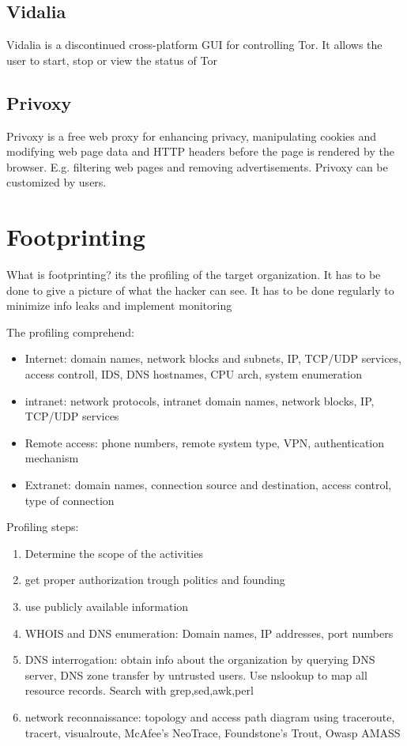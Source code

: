 \subsection{Vidalia}
Vidalia is a discontinued cross-platform GUI for controlling Tor.
It allows the user to start, stop or view the status of Tor

\subsection{Privoxy}
Privoxy is a free web proxy for enhancing
privacy, manipulating cookies and
modifying web page data and HTTP headers
before the page is rendered by the browser.
E.g. filtering web pages and removing
advertisements. Privoxy can be customized by
users.

\section{Footprinting}
What is footprinting? its the profiling of the target organization. It has to be done to give a picture of what the hacker can see. It has to be done regularly to minimize info leaks and implement monitoring

The profiling comprehend: 
\begin{itemize}
    \item Internet: domain names, network blocks and subnets, IP, TCP/UDP services, access controll, IDS, DNS hostnames, CPU arch, system enumeration
    \item intranet: network protocols, intranet domain names, network blocks, IP, TCP/UDP services
    \item Remote access: phone numbers, remote system type, VPN, authentication mechanism
    \item Extranet: domain names, connection source and destination, access control, type of connection
\end{itemize}

Profiling steps:
\begin{enumerate}
    \item Determine the scope of the activities
    \item get proper authorization trough politics and founding
    \item use publicly available information
    \item WHOIS and DNS enumeration: Domain names, IP addresses, port numbers
    \item DNS interrogation: obtain info about the organization by querying DNS server, DNS zone transfer by untrusted users. Use nslookup to map all resource records. Search with grep,sed,awk,perl
    \item network reconnaissance: topology and access path diagram using traceroute, tracert, visualroute, McAfee’s
NeoTrace, Foundstone’s Trout, Owasp
AMASS

\end{enumerate}

